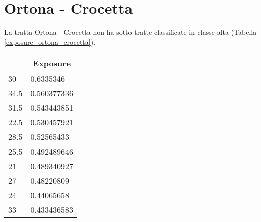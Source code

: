 \section{Ortona - Crocetta}
La tratta Ortona - Crocetta non ha sotto-tratte classificate in classe alta (Tabella \ref{exposure_ortona_crocetta}). 
\begin{table}[H]
	\centering
	\begin{tabular}{|l|l|}
		\hline
		\rowcolor[HTML]{C0C0C0} 
		\multicolumn{1}{|c|}{\cellcolor[HTML]{C0C0C0}\textbf{Km}} & \multicolumn{1}{c|}{\cellcolor[HTML]{C0C0C0}\textbf{Exposure}} \\ \hline
		\rowcolor[HTML]{F8FF00} 
		30                                                        & 0.6335346                                                      \\ \hline
		\rowcolor[HTML]{F8FF00} 
		34.5                                                      & 0.560377336                                                    \\ \hline
		\rowcolor[HTML]{F8FF00} 
		31.5                                                      & 0.543443851                                                    \\ \hline
		\rowcolor[HTML]{F8FF00} 
		22.5                                                      & 0.530457921                                                    \\ \hline
		\rowcolor[HTML]{F8FF00} 
		28.5                                                      & 0.52565433                                                     \\ \hline
		\rowcolor[HTML]{F8FF00} 
		25.5                                                      & 0.492489646                                                    \\ \hline
		\rowcolor[HTML]{F8FF00} 
		21                                                        & 0.489340927                                                    \\ \hline
		\rowcolor[HTML]{F8FF00} 
		27                                                        & 0.48220809                                                     \\ \hline
		\rowcolor[HTML]{F8FF00} 
		24                                                        & 0.44065658                                                     \\ \hline
		\rowcolor[HTML]{F8FF00} 
		33                                                        & 0.433436583                                                    \\ \hline

\end{tabular}
\end{table}
